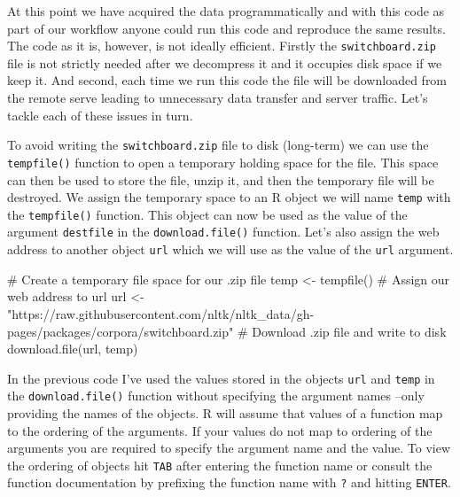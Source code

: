 \documentclass[
  letterpaper,
]{latex/krantz}
\newenvironment{Shaded}{\begin{snugshade}}{\end{snugshade}}
\newcommand{\CommentTok}[1]{\textcolor[rgb]{0.37,0.37,0.37}{#1}}
\newcommand{\FunctionTok}[1]{\textcolor[rgb]{0.28,0.35,0.67}{#1}}
\newcommand{\NormalTok}[1]{\textcolor[rgb]{0.00,0.23,0.31}{#1}}
\newcommand{\OtherTok}[1]{\textcolor[rgb]{0.00,0.23,0.31}{#1}}
\newcommand{\StringTok}[1]{\textcolor[rgb]{0.13,0.47,0.30}{#1}}
\begin{document}
At this point we have acquired the data programmatically and with this
code as part of our workflow anyone could run this code and reproduce
the same results. The code as it is, however, is not ideally efficient.
Firstly the \texttt{switchboard.zip} file is not strictly needed after
we decompress it and it occupies disk space if we keep it. And second,
each time we run this code the file will be downloaded from the remote
serve leading to unnecessary data transfer and server traffic. Let's
tackle each of these issues in turn.

To avoid writing the \texttt{switchboard.zip} file to disk (long-term)
we can use the \texttt{tempfile()} function to open a temporary holding
space for the file. This space can then be used to store the file, unzip
it, and then the temporary file will be destroyed. We assign the
temporary space to an R object we will name \texttt{temp} with the
\texttt{tempfile()} function. This object can now be used as the value
of the argument \texttt{destfile} in the \texttt{download.file()}
function. Let's also assign the web address to another object
\texttt{url} which we will use as the value of the \texttt{url}
argument.

\begin{Shaded}
\begin{Highlighting}[]
\CommentTok{\# Create a temporary file space for our .zip file}
\NormalTok{temp }\OtherTok{\textless{}{-}} \FunctionTok{tempfile}\NormalTok{()}
\CommentTok{\# Assign our web address to \textasciigrave{}url\textasciigrave{}}
\NormalTok{url }\OtherTok{\textless{}{-}} \StringTok{"https://raw.githubusercontent.com/nltk/nltk\_data/gh{-}pages/packages/corpora/switchboard.zip"}
\CommentTok{\# Download .zip file and write to disk}
\FunctionTok{download.file}\NormalTok{(url, temp)}
\end{Highlighting}
\end{Shaded}

\begin{tcolorbox}[enhanced jigsaw, opacitybacktitle=0.6, breakable, colframe=quarto-callout-warning-color-frame, arc=.35mm, left=2mm, leftrule=.75mm, title=\textcolor{quarto-callout-warning-color}{\faExclamationTriangle}\hspace{0.5em}{Tip}, opacityback=0, colback=white, toptitle=1mm, rightrule=.15mm, titlerule=0mm, bottomtitle=1mm, bottomrule=.15mm, coltitle=black, colbacktitle=quarto-callout-warning-color!10!white, toprule=.15mm]
In the previous code I've used the values stored in the objects
\texttt{url} and \texttt{temp} in the \texttt{download.file()} function
without specifying the argument names --only providing the names of the
objects. R will assume that values of a function map to the ordering of
the arguments. If your values do not map to ordering of the arguments
you are required to specify the argument name and the value. To view the
ordering of objects hit \texttt{TAB} after entering the function name or
consult the function documentation by prefixing the function name with
\texttt{?} and hitting \texttt{ENTER}.
\end{tcolorbox}
\end{document}
